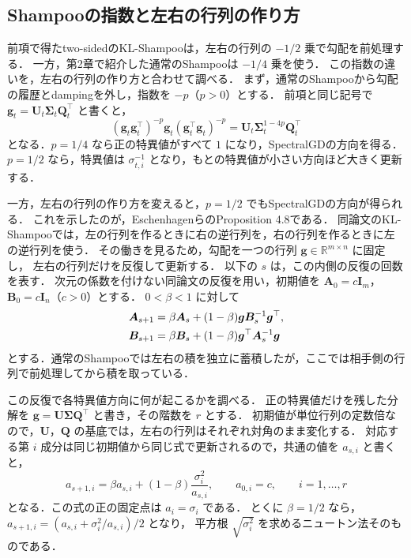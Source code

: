 \documentclass[../main.tex]{subfiles}
\begin{document}
\subsection{Shampooの指数と左右の行列の作り方}
\label{subsec:adagrad-shampoo-exponents}

前項で得たtwo-sidedのKL-Shampooは，左右の行列の $-1/2$ 乗で勾配を前処理する．
一方，第2章で紹介した通常のShampooは $-1/4$ 乗を使う．
この指数の違いを，左右の行列の作り方と合わせて調べる．
まず，通常のShampooから勾配の履歴とdampingを外し，指数を $-p$（$p>0$）とする．
前項と同じ記号で $\bm{g}_t=\bm{U}_t\bm{\Sigma}_t\bm{Q}_t^\top$ と書くと，
\begin{equation}
  (\bm{g}_t\bm{g}_t^\top)^{-p}\bm{g}_t
  (\bm{g}_t^\top\bm{g}_t)^{-p}
  =\bm{U}_t\bm{\Sigma}_t^{1-4p}\bm{Q}_t^\top
  \label{eq:adagrad-shampoo-general-exponent}
\end{equation}
となる．$p=1/4$ なら正の特異値がすべて $1$ になり，SpectralGDの方向を得る．
$p=1/2$ なら，特異値は $\sigma_{t,i}^{-1}$ となり，もとの特異値が小さい方向ほど大きく更新する．

一方，左右の行列の作り方を変えると，$p=1/2$ でもSpectralGDの方向が得られる．
これを示したのが，EschenhagenらのProposition 4.8である\cite{eschenhagen2026clarifying}．
同論文のKL-Shampooでは，左の行列を作るときに右の逆行列を，右の行列を作るときに左の逆行列を使う．
その働きを見るため，勾配を一つの行列 $\bm{g}\in\mathbb{R}^{m\times n}$ に固定し，
左右の行列だけを反復して更新する．
以下の $s$ は，この内側の反復の回数を表す．
次元の係数を付けない同論文の反復を用い，初期値を $\bm{A}_0=c\bm{I}_m$，$\bm{B}_0=c\bm{I}_n$（$c>0$）とする．
$0<\beta<1$ に対して
\begin{align}
  \bm{A}_{s+1}
  &=\beta\bm{A}_s+(1-\beta)\bm{g}\bm{B}_s^{-1}\bm{g}^\top,
  \notag\\
  \bm{B}_{s+1}
  &=\beta\bm{B}_s+(1-\beta)\bm{g}^\top\bm{A}_s^{-1}\bm{g}
  \label{eq:adagrad-coupled-shampoo-iteration}
\end{align}
とする．通常のShampooでは左右の積を独立に蓄積したが，ここでは相手側の行列で前処理してから積を取っている．

この反復で各特異値方向に何が起こるかを調べる．
正の特異値だけを残した分解を $\bm{g}=\bm{U}\bm{\Sigma}\bm{Q}^\top$ と書き，その階数を $r$ とする．
初期値が単位行列の定数倍なので，$\bm{U}$，$\bm{Q}$ の基底では，左右の行列はそれぞれ対角のまま変化する．
対応する第 $i$ 成分は同じ初期値から同じ式で更新されるので，共通の値を $a_{s,i}$ と書くと，
\begin{equation}
  a_{s+1,i}
  =\beta a_{s,i}+(1-\beta)\frac{\sigma_i^2}{a_{s,i}},
  \qquad a_{0,i}=c,\qquad i=1,\ldots,r
  \label{eq:adagrad-coupled-shampoo-scalar}
\end{equation}
となる．この式の正の固定点は $a_i=\sigma_i$ である．
とくに $\beta=1/2$ なら，$a_{s+1,i}=(a_{s,i}+\sigma_i^2/a_{s,i})/2$ となり，
平方根 $\sqrt{\sigma_i^2}$ を求めるニュートン法そのものである．
\end{document}
